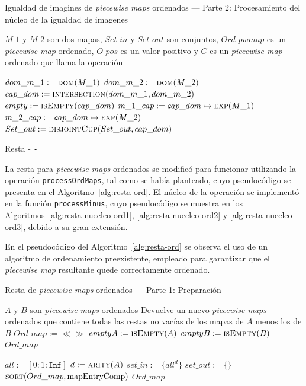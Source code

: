 \begin{algorithm}
\caption{Igualdad de imagines de \textit{piecewise maps} ordenados — Parte 2: Procesamiento del núcleo de la igualdad de imagenes}
\label{alg:equalImage-ord-nucleo}
\begin{algorithmic}[1]
\Require $M\_1$ y $M\_2$ son dos mapas, $Set\_in$ y $Set\_out$ son conjuntos, $Ord\_pwmap$ es un \textit{piecewise map} ordenado, $O\_pos$ es un valor positivo y $C$ es un \textit{piecewise map} ordenado que llama la operación

    \State $dom\_m\_1 := \Call{dom}{M\_1}$
    \State $dom\_m\_2 := \Call{dom}{M\_2}$
    \State $cap\_dom := \Call{intersection}{dom\_m\_1, dom\_m\_2}$
    \State $empty := \Call{isEmpty}{cap\_dom}$
        \State $m\_1\_cap := cap\_dom \mapsto \Call{exp}{M\_1}$
        \State $m\_2\_cap := cap\_dom \mapsto \Call{exp}{M\_2}$
            \State $Set\_out := \Call{disjointCup}{Set\_out, cap\_dom}$
        \EndIf
    \EndIf
    \State \Return
\EndFunction
\end{algorithmic}
\end{algorithm}

{Resta - \texttt{-}}

La resta para \textit{piecewise maps} ordenados se modificó para funcionar utilizando la operación \texttt{processOrdMaps}, tal como se había planteado, cuyo pseudocódigo se presenta en el Algoritmo~\ref{alg:resta-ord}.  
El núcleo de la operación se implementó en la función \texttt{processMinus}, cuyo pseudocódigo se muestra en los Algoritmos~\ref{alg:resta-nuecleo-ord1}, \ref{alg:resta-nuecleo-ord2} y \ref{alg:resta-nuecleo-ord3}, debido a su gran extensión.


En el pseudocódigo del Algoritmo~\ref{alg:resta-ord} se observa el uso de un algoritmo de ordenamiento preexistente, empleado para garantizar que el \textit{piecewise map} resultante quede correctamente ordenado.


\begin{algorithm}
\caption{Resta de \textit{piecewise maps} ordenados — Parte 1: Preparación}
\label{alg:resta-ord}
\begin{algorithmic}[1]
\Require $A$ y $B$ son \textit{piecewise maps} ordenados
\Ensure Devuelve un nuevo \textit{piecewise maps} ordenados que contiene todas las restas no vacías de los mapas de $A$ menos los de $B$
    \State $Ord\_map := \ll\gg$
    \State $emptyA := \Call{isEmpty}{A}$
    \State $emptyB := \Call{isEmpty}{B}$
        \State \Return $Ord\_map$
    \EndIf

    \State $all := [0: 1: \texttt{Inf}]$ 
    \State$d := \Call{arity}{A}$
    \State $set\_in := \{all^{d}\}$
    \State $set\_out := \{\}$
    \State {}
    \State $\Call{sort}{Ord\_map, \mathrm{mapEntryComp}}$
    \State \Return $Ord\_map$
\EndFunction
\end{algorithmic}
\end{algorithm}

